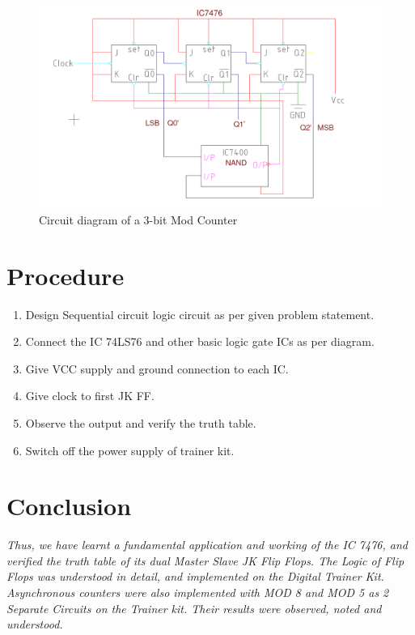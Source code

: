 \documentclass[11pt]{article}
\begin{document}
\begin{figure}[H]
	\centering
	\includegraphics[scale = 0.5]{mod 5 counter.png}
	\caption{Circuit diagram of a 3-bit Mod Counter}
\end{figure}

\section{Procedure}

\begin{enumerate}
	\item Design Sequential circuit logic circuit as per given problem statement.
	\item Connect the IC 74LS76 and other basic logic gate ICs as per diagram.
	\item Give VCC supply and ground connection to each IC.
	\item Give clock to first JK FF.
	\item Observe the output and verify the truth table.
	\item Switch off the power supply of trainer kit.
\end{enumerate}

\section{Conclusion}
\textit{Thus, we have learnt a fundamental application and working of the IC 7476, and verified the truth table of its dual Master Slave JK Flip Flops. The Logic of Flip Flops was understood in detail, and implemented on the Digital Trainer Kit. Asynchronous counters were also implemented with MOD 8 and MOD 5 as 2 Separate Circuits on the Trainer kit. Their results were observed, noted and understood. }
\pagebreak
\end{document}
